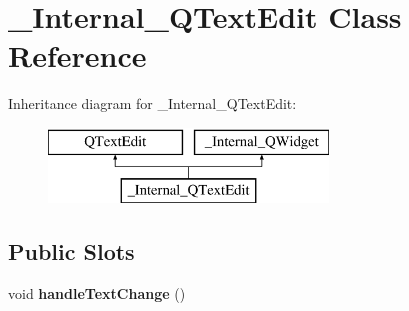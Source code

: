 \hypertarget{class__Internal__QTextEdit}{}\section{\+\_\+\+Internal\+\_\+\+Q\+Text\+Edit Class Reference}
\label{class__Internal__QTextEdit}
Inheritance diagram for \+\_\+\+Internal\+\_\+\+Q\+Text\+Edit\+:\begin{figure}[H]
\begin{center}
\leavevmode
\includegraphics[height=2.000000cm]{class__Internal__QTextEdit}
\end{center}
\end{figure}
\subsection*{Public Slots}
\begin{DoxyCompactItemize}
\item 
\mbox{\label{class__Internal__QTextEdit_a1e7d138362fcc9497c495184b9f0ccfa}} 
void {\bfseries handle\+Text\+Change} ()
\end{DoxyCompactItemize}
